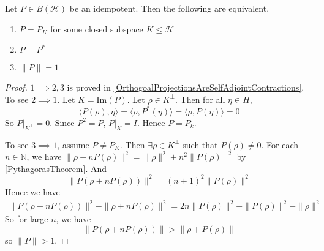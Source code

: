 \begin{theorem}
  Let $P \in B(\mathcal{H})$ be an idempotent. Then the following are
  equivalent.
  \begin{enumerate}[label=(\arabic*)]
    \item $P = P_K$ for some closed subspace $K \leqslant \mathcal{H}$
    \item $P = P^*$
    \item $\|P\| = 1$
  \end{enumerate}
\end{theorem}
\begin{proof}
  $1 \implies 2, 3$ is proved in
  \autoref{OrthogoalProjectionsAreSelfAdjointContractions}.
  To see $2 \implies 1$. Let $K = \textrm{Im}(P)$. Let $\rho \in
  K^\perp$. Then for all $\eta \in H$, \[
    \langle P(  \rho) ,  \eta \rangle  = \langle \rho ,  P^*(\eta)
    \rangle  = \langle \rho ,  P(\eta) \rangle = 0
  \]
  So $P|_{K^\perp} = 0$. Since $P^2 = P$, $P|_K = I$.  Hence $P = P_k$.

  To see $3 \implies 1$, assume $P \neq P_K$. Then $\exists \rho \in K^\perp$
  such that $P(\rho) \neq 0$. For each $n \in \mathbb{N}$, we have
  $\|\rho + n P(\rho)\|^2 = \|\rho\|^2 + n^2 \|P(\rho)\|^2$ by
  \autoref{PythagorasTheorem}.
  And \[
    \|P(\rho + n P(\rho))\|^2 = (n+1)^2 \|P(\rho)\|^2
  \]
  \marginnote{ \scriptsize \textit{\textcolor{red}{nice technique}}}
  Hence we have
  \begin{align*}
    \|P(\rho + n P(\rho))\|^2 - \|\rho + n P(\rho)\|^2 = 2n
    \|P(\rho)\|^2 + \|P(\rho)\|^2 - \|\rho\|^2
  \end{align*}
  So for large $n$, we have \[
    \|P(\rho + n P(\rho))\| > \|\rho + P(\rho)\|
  \]
  so $\|P\| > 1$.
\end{proof}

